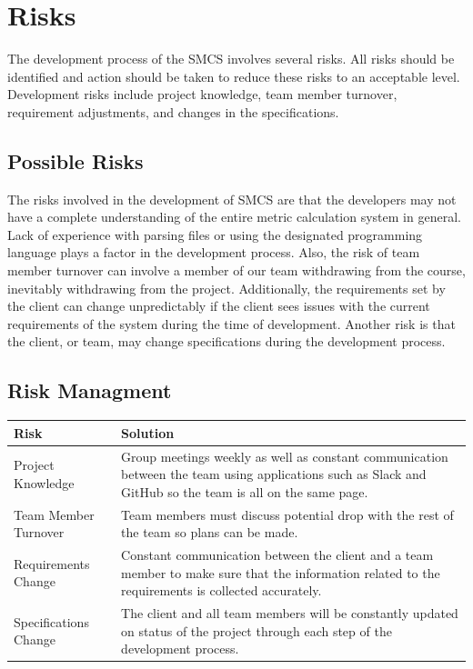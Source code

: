 \documentclass{scrreprt}
\begin{document}
	\chapter{Risks}
	The development process of the SMCS involves several risks. All risks should be identified and action should be taken to reduce these risks to an acceptable level. Development risks include project knowledge, team member turnover, requirement adjustments, and changes in the specifications.
	\section{Possible Risks}
	The risks involved in the development of SMCS are that the developers may not have a complete understanding of the entire metric calculation system in general. Lack of experience with parsing files or using the designated programming language plays a factor in the development process. Also, the risk of team member turnover can involve a member of our team withdrawing from the course, inevitably withdrawing from the project. Additionally, the requirements set by the client can change unpredictably if the client sees issues with the current requirements of the system during the time of development. Another risk is that the client, or team, may change specifications during the development process.
	\section{Risk Managment}
	\begin{tabular}{|p{5cm}|p{9cm}|}
		\hline 
		Risk & Solution \\ 
		\hline 
		Project Knowledge &  Group meetings weekly as well as constant communication between the team using applications such as Slack and GitHub so the team is all on the same page.\\ 
		\hline 
		Team Member Turnover & Team members must discuss potential drop with the rest of the team so plans can be made.\\ 
		\hline 
		Requirements Change & Constant communication between the client and a team member to make sure that the information related to the requirements is collected accurately.\\ 
		\hline 
		Specifications Change & The client and all team members will be constantly updated on status of the project through each step of the development process. \\ 
		\hline 
	\end{tabular} 
\end{document}

